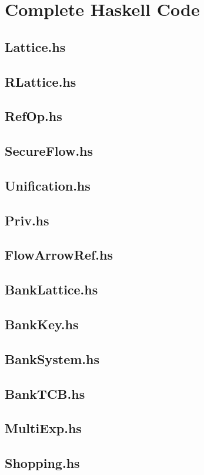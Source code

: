 \documentclass[a4paper]{report}
\begin{document}
\section{Complete Haskell Code}

\subsection{Lattice.hs}

\subsection{RLattice.hs}

\subsection{RefOp.hs}

\subsection{SecureFlow.hs}

\subsection{Unification.hs}

\subsection{Priv.hs}

\subsection{FlowArrowRef.hs}

\subsection{BankLattice.hs}

\subsection{BankKey.hs}

\subsection{BankSystem.hs}

\subsection{BankTCB.hs}

\subsection{MultiExp.hs}

\subsection{Shopping.hs}

\end{document}
